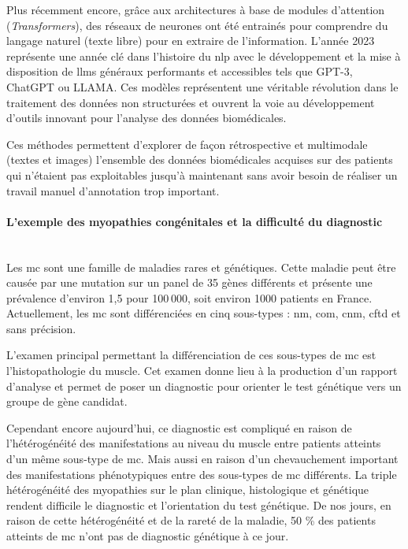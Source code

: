 Plus récemment encore, grâce aux architectures à base de modules d’attention (\textit{Transformers}), des réseaux de neurones ont été entrainés pour comprendre du langage naturel (texte libre) pour en extraire de l’information. L’année 2023 représente une année clé dans l’histoire du \gls{nlp} avec le développement et la mise à disposition de \gls{llms} généraux performants et accessibles tels que GPT-3, ChatGPT ou LLAMA. Ces modèles représentent une véritable révolution dans le traitement des données non structurées et ouvrent la voie au développement d’outils innovant pour l’analyse des données biomédicales.

Ces méthodes permettent d’explorer de façon rétrospective et multimodale (textes et images) l’ensemble des données biomédicales acquises sur des patients qui n’étaient pas exploitables jusqu’à maintenant sans avoir besoin de réaliser un travail manuel d’annotation trop important.


\paragraph{\textbf{L’exemple des myopathies congénitales et la difficulté du diagnostic}}\mbox{}\\

Les \gls{mc} sont une famille de maladies rares et génétiques. Cette maladie peut être causée par une mutation sur un panel de 35 gènes différents et présente une prévalence d’environ 1,5 pour 100 000, soit environ 1000 patients en France. Actuellement, les \gls{mc} sont différenciées en cinq sous-types : \gls{nm}, \gls{com}, \gls{cnm}, \gls{cftd} et sans précision.

L’examen principal permettant la différenciation de ces sous-types de \gls{mc} est l’histopathologie du muscle. Cet examen donne lieu à la production d’un rapport d’analyse et permet de poser un diagnostic pour orienter le test génétique vers un groupe de gène candidat.

Cependant encore aujourd’hui, ce diagnostic est compliqué en raison de l’hétérogénéité des manifestations au niveau du muscle entre patients atteints d’un même sous-type de \gls{mc}. Mais aussi en raison d’un chevauchement important des manifestations phénotypiques entre des sous-types de \gls{mc} différents. La triple hétérogénéité des myopathies sur le plan clinique, histologique et génétique rendent difficile le diagnostic et l’orientation du test génétique. De nos jours, en raison de cette hétérogénéité et de la rareté de la maladie, 50 \% des patients atteints de \gls{mc} n’ont pas de diagnostic génétique à ce jour. 


